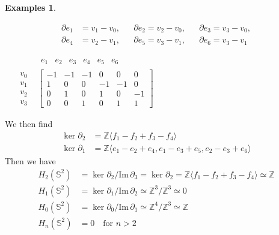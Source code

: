 \documentclass[draft,toc=bib]{scrartcl}
\theoremstyle{plain}
\theoremstyle{definition}
\newtheorem{examples}[theorem]{Examples}
\theoremstyle{remark}
\newcommand{\Z}{\mathbb{Z}}
\newcommand{\Sp}{\mathbb{S}}
\newcommand{\im}{\mathrm{Im}\,}
\begin{document}
\begin{examples}
\begin{enumerate}
\parbox[c]{.5\linewidth}{
\begin{align*}
	\partial e_1&=v_1-v_0,&&\partial e_2=v_2-v_0,&&\partial e_3=v_3-v_0,\\
	\partial e_4&=v_2-v_1,&&\partial e_5=v_3-v_1,&&\partial e_6=v_3-v_1
\end{align*}}%
\parbox[c]{.5\linewidth}{$
\quad\begin{matrix}
	&\begin{matrix}e_1&e_2&e_3&e_4&e_5&e_6	\end{matrix}\\
	\begin{matrix}v_0\\v_1\\v_2\\v_3\end{matrix}&
	\begin{bmatrix}
	-1	&-1	&-1	&0	&0	&0\\
	1	&0	&0	&-1	&-1	&0\\
	0	&1	&0	&1	&0	&-1\\
	0	&0	&1	&0	&1	&1
	\end{bmatrix}
\end{matrix}$
}
We then find
\begin{align*}
\ker \partial_2&=\Z\langle f_1-f_2+f_3-f_4\rangle\\
\ker \partial_1&=\Z\langle e_1-e_2+e_4,e_1-e_3+e_5, e_2-e_3+e_6 \rangle
\end{align*}
Then we have
\begin{align*}
	H_2(\Sp^2)&=\ker \partial_2/\im \partial_3=\ker \partial_2=\Z\langle f_1-f_2+f_3-f_4\rangle\simeq\Z\\
	H_1(\Sp^2)&=\ker \partial_1/\im \partial_2\simeq\Z^3/\Z^3\simeq 0\\
	H_0(\Sp^2)&=\ker\partial_0/\im \partial_1\simeq \Z^4/\Z^3\simeq \Z\\
	H_n(\Sp^2)&=0\quad \text{for $n>2$}
\end{align*}



\end{enumerate}
\end{examples}
\end{document}
